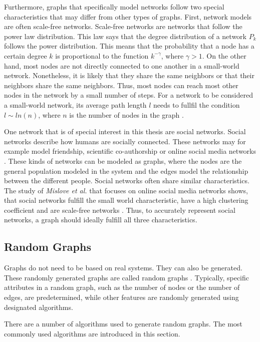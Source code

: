 Furthermore, graphs that specifically model networks follow two special 
characteristics that may differ from other types of graphs.
First, network models are often scale-free networks.
Scale-free networks are networks that follow the power law distribution.
This law says that the degree distribution of a network
$P_k$ follows the power distribution.
This means that the probability that a node has a certain degree $k$ 
is proportional to the function $k^{-\gamma}$, where
$\gamma>1$.
On the other hand, most nodes are not directly
connected to one another in a small-world network.
Nonetheless, it is likely that they share the same neighbors or that their
neighbors share the same neighbors. 
Thus, most nodes can reach most other
nodes in the network by a small number of steps. For a network
to be considered a small-world network, its average path length $l$ 
needs to fullfil the condition $l\sim ln(n)$, where $n$ is the number
of nodes in the graph \cite{wattsmodel}.

One network that is of special interest in this thesis are social networks.
Social networks describe how humans are socially connected. 
These networks may for example model friendship, scientific co-authorship 
or online social media networks \cite{basicnetwork}. 
These kinds of networks can be modeled as graphs, where the nodes 
are the general population modeled in the system
and the edges model the relationship between the 
different people.
Social networks often share similar characteristics. The study of 
\textit{Mislove et al.} that focuses on online social media networks
shows, that social networks fulfill the small world characteristic,
have a high clustering coefficient and are scale-free networks
\cite{mislovesocialnetworkcharacteristics}. Thus, to accurately represent 
social networks, a graph should ideally fulfill all three characteristics.

\subsection{Random Graphs}
\label{randomgraphssection}
Graphs do not need to be based on real systems. They can also be generated. 
These randomly generated graphs are called random graphs \cite{randomgraphs}.
Typically, specific attributes in a random graph, such as the number of nodes 
or the number of edges, are predetermined, 
while other features are randomly generated using designated algorithms.

There are a number of algorithms used to generate random graphs.
The most commonly used algorithms are introduced in this section.

